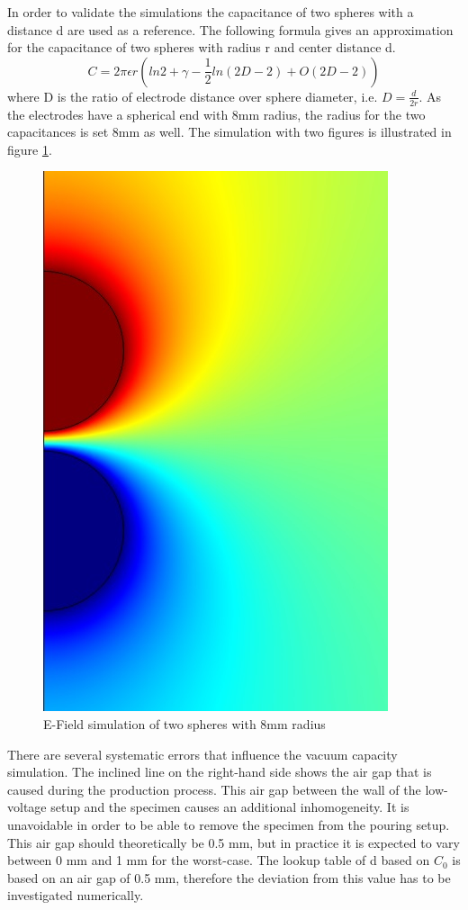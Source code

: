 In order to validate the simulations the capacitance of two spheres with a distance d are used as a reference. The following formula gives an approximation for the capacitance of two spheres with radius r and center distance d. \cite{Rawlins}
\begin{equation}
C=2 \pi \epsilon r ( ln 2 + \gamma -\frac{1}{2} ln(2D-2)+O(2D-2))
\end{equation}
where D is the ratio of electrode distance over sphere diameter, i.e. $ D=\frac{d}{2r}$. As the electrodes have a spherical end with 8mm radius, the radius for the two capacitances is set 8mm as well. The simulation with two figures is illustrated in figure \ref{fig.twospheres}.  
\begin{figure}[htbp]
	\centering
	\includegraphics[scale=0.3]{figures/Method/Part1_d_C0/sphere_capacity.jpg}		
	\caption[Kurze Abbildungsbeschreibung]{E-Field simulation of two spheres with 8mm radius } \label{fig.comsol_sphere}
	\label{fig.twospheres}
\end{figure}


 There are several systematic errors that influence the vacuum capacity simulation. The inclined line on the right-hand side shows the air gap that is caused during the production process. This air gap between the wall of the low-voltage setup and the specimen causes an additional inhomogeneity. It is unavoidable in order to be able to remove the specimen from the pouring setup. This air gap should theoretically be 0.5 mm, but in practice it is expected to vary between 0 mm and 1 mm for the worst-case. The lookup table of d based on $C_0$ is based on an air gap of 0.5 mm, therefore the deviation from this value has to be investigated numerically.
 
